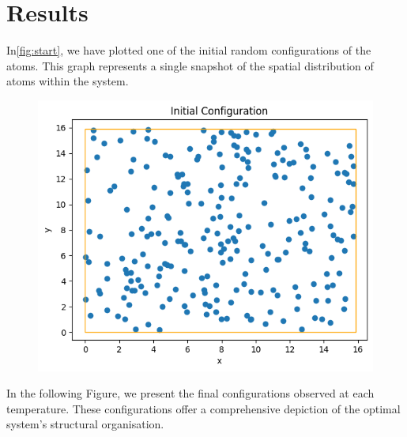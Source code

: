 \documentclass{article}
\begin{document}
\section{Results}
In\autoref{fig:start}, we have plotted one of the initial random configurations of the atoms. This graph represents a single snapshot of the spatial distribution of atoms within the system.
\begin{figure}[H]
    \centering
    \includegraphics[width=.6\linewidth]{images/Start.png}
    \caption{}
    \label{fig:start}
\end{figure}
\noindent In the following Figure, we present the final configurations observed at each temperature. These configurations offer a comprehensive depiction of the optimal system's structural organisation.
\end{document}
